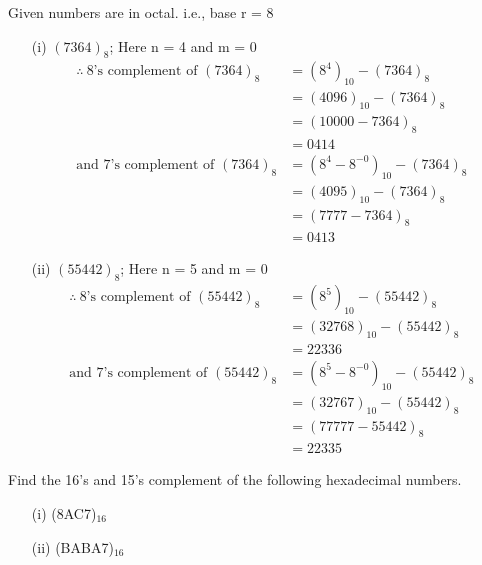 \begin{solution}
Given numbers are in octal. i.e., base r = 8
\begin{itemize}
\item[(i)] $(7364)_{8}$\qquad ; Here n = 4 and m = 0
\begin{align*}
\therefore~ \text{8's complement of } (7364)_{8} &= (8^{4})_{10}-(7364)_{8}\\[3pt]
 &= (4096)_{10}-(7364)_{8}\\[3pt]
&= (10000-7364)_{8}\\[3pt]
&= 0414\\[3pt]
\text{and 7's complement of } (7364)_{8} &= (8^{4}-8^{-0})_{10}-(7364)_{8}\\[3pt]
&= (4095)_{10}-(7364)_{8}\\[3pt]
&= (7777-7364)_{8}\\[3pt]
&= 0413
\end{align*}

\item[(ii)] $(55442)_{8}$\qquad ; Here n = 5 and m = 0
\begin{align*}
\therefore~ \text{8's complement of } (55442)_{8} &= (8^{5})_{10}-(55442)_{8}\\[3pt]
&= (32768)_{10}-(55442)_{8}\\[3pt]
&= 22336\\[3pt]
\text{and 7's complement of } (55442)_{8} &= (8^{5}-8^{-0})_{10}-(55442)_{8}\\[3pt]
&= (32767)_{10}-(55442)_{8}\\[3pt]
&= (77777-55442)_{8}\\[3pt]
&= 22335
\end{align*}
\end{itemize}
\end{solution}

\begin{problem}\label{prob5.26}
Find the 16's and 15's complement of the following hexadecimal numbers.
\begin{itemize}
\item[(i)] (8AC7)$_{16}$

\item[(ii)] (BABA7)$_{16}$
\end{itemize}
\end{problem}

